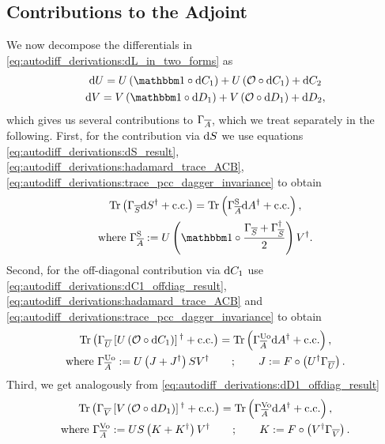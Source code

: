 \subsection{Contributions to the Adjoint}
\label{subsec:autodiff_derivation:svd:contributions}

We now decompose the differentials in \eqref{eq:autodiff_derivations:dL_in_two_forms} as
\begin{gather}
    \dU = U\rBr{\eye\hadamard\dC_1} + U\rBr{\Off\hadamard\dC_1} + \dC_2
    \\
    \dV = V\rBr{\eye\hadamard\dD_1} + V\rBr{\Off\hadamard\dD_1} + \dD_2
    ,
\end{gather}
which gives us several contributions to $\Gamma_{\overline{A}}$, which we treat separately in the following.
%
First, for the contribution via $\mathrm{d}{S}$ we use equations \eqref{eq:autodiff_derivations:dS_result}, \eqref{eq:autodiff_derivations:hadamard_trace_ACB}, \eqref{eq:autodiff_derivations:trace_pcc_dagger_invariance} to obtain
\begin{gather}
    \tr{\Gconj{S}\dS^{\dagger}\pcc} = \tr{\GcAs\dA^{\dagger}\pcc}
    ,
    \\
    \text{where } \GcAs := U \rBr{\eye\hadamard\frac{\Gconj{S} + \Gconj{S}^{\dagger}}{2}} V^{\dagger}
    .
\end{gather}
%
Second, for the off-diagonal contribution via $\mathrm{d}{C}_1$ use \eqref{eq:autodiff_derivations:dC1_offdiag_result}, \eqref{eq:autodiff_derivations:hadamard_trace_ACB} and \eqref{eq:autodiff_derivations:trace_pcc_dagger_invariance} to obtain
\begin{gather}
    \tr{\Gconj{U}\sBr{U\rBr{\Off\hadamard\dC_1}}^{\dagger}\pcc} = \tr{\GcAuo\dA^{\dagger}\pcc}
    ,
    \\
    \text{where } \GcAuo := U \rBr{J + J^{\dagger}} S V^{\dagger}
    \qquad ; \qquad
    J := F\hadamard\rBr{U^{\dagger}\Gconj{U}}
    .
\end{gather}
%
Third, we get analogously from \eqref{eq:autodiff_derivations:dD1_offdiag_result}
\begin{gather}
    \tr{\Gconj{V}\sBr{V\rBr{\Off\hadamard\dD_1}}^{\dagger}\pcc} = \tr{\GcAvo\dA^{\dagger}\pcc}
    ,
    \\
    \text{where } \GcAvo := U S\rBr{K + K^{\dagger}}V^{\dagger}
    \qquad ; \qquad
    K := F\hadamard\rBr{V^{\dagger}\Gconj{V}}
    .
\end{gather}

